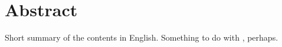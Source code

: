 \begingroup
\let\clearpage\relax
\let\cleardoublepage\relax
\let\cleardoublepage\relax

\chapter*{Abstract}

Short summary of the contents in English.
Something to do with \citep{Yoshida:2007ja}, perhaps.

\endgroup			

\vfill
